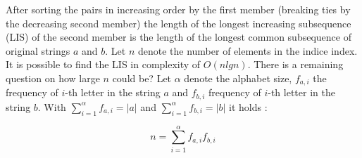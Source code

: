 \documentclass[times, utf8, diplomski]{fer}
\begin{document}
\begin{table}[H]
  \centering
  \centering
  \caption{Longest increasing subsequence (LCS) setup}\label{indeks}
\end{table}

After sorting the pairs in increasing order by the first member (breaking ties by the decreasing second member) the length of the longest increasing subsequence (LIS) of the second member is the length of the longest common subsequence of original strings $a$ and $b$. Let $n$ denote the number of elements in the indice index. It is possible to find the LIS in complexity of $O(n lg n)$. There is a remaining question on how large $n$ could be? Let $\alpha$ denote the alphabet size, $f_{a,i}$ the 
frequency of $i$-th letter in the string $a$ and $f_{b,i}$ frequency of $i$-th letter in the string $b$. With $\sum\limits_{i=1}^{\alpha}f_{a,i}=|a|$ and $\sum\limits_{i=1}^{\alpha}f_{b,i}=|b|$ it holds	:

\begin{equation}
	n = \sum\limits_{i=1}^{\alpha}f_{a,i}f_{b,i}
\end{equation}
\end{document}
